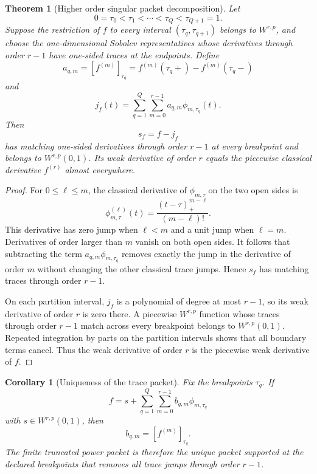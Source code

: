 \documentclass[11pt,letterpaper]{article}
\newtheorem{theorem}{Theorem}[section]
\theoremstyle{plain}
\theoremstyle{plain}
\theoremstyle{plain}
\newtheorem{corollary}[corollary]{Corollary}
\theoremstyle{definition}
\theoremstyle{definition}
\theoremstyle{definition}
\theoremstyle{definition}
\theoremstyle{remark}
\theoremstyle{remark}
\theoremstyle{remark}
\theoremstyle{remark}
\newcommand{\jump}[1]{\left[#1\right]}
\begin{document}
\begin{theorem}[Higher order singular packet decomposition]\label{thm:higher_order_packet_decomposition}
Let
\[
0=\tau_0<\tau_1<\cdots<\tau_Q<\tau_{Q+1}=1.
\]
Suppose the restriction of \(f\) to every interval \((\tau_q,\tau_{q+1})\) belongs to \(W^{r,p}\), and choose the one-dimensional Sobolev representatives whose derivatives through order \(r-1\) have one-sided traces at the endpoints. Define
\[
a_{q,m}
=
\jump{f^{(m)}}_{\tau_q}
=
f^{(m)}(\tau_q+)-f^{(m)}(\tau_q-)
\]
and
\[
j_f(t)
=
\sum_{q=1}^{Q}\sum_{m=0}^{r-1}a_{q,m}\phi_{m,\tau_q}(t).
\]
Then
\[
s_f=f-j_f
\]
has matching one-sided derivatives through order \(r-1\) at every breakpoint and belongs to \(W^{r,p}(0,1)\). Its weak derivative of order \(r\) equals the piecewise classical derivative \(f^{(r)}\) almost everywhere.
\end{theorem}

\begin{proof}
For \(0\leq \ell\leq m\), the classical derivative of \(\phi_{m,\tau}\) on the two open sides is
\[
\phi_{m,\tau}^{(\ell)}(t)
=
\frac{(t-\tau)_+^{m-\ell}}{(m-\ell)!}.
\]
This derivative has zero jump when \(\ell<m\) and a unit jump when \(\ell=m\). Derivatives of order larger than \(m\) vanish on both open sides. It follows that subtracting the term \(a_{q,m}\phi_{m,\tau_q}\) removes exactly the jump in the derivative of order \(m\) without changing the other classical trace jumps. Hence \(s_f\) has matching traces through order \(r-1\).

On each partition interval, \(j_f\) is a polynomial of degree at most \(r-1\), so its weak derivative of order \(r\) is zero there. A piecewise \(W^{r,p}\) function whose traces through order \(r-1\) match across every breakpoint belongs to \(W^{r,p}(0,1)\). Repeated integration by parts on the partition intervals shows that all boundary terms cancel. Thus the weak derivative of order \(r\) is the piecewise weak derivative of \(f\).
\end{proof}

\begin{corollary}[Uniqueness of the trace packet]\label{cor:trace_packet_uniqueness}
Fix the breakpoints \(\tau_q\). If
\[
f=s+\sum_{q=1}^{Q}\sum_{m=0}^{r-1}b_{q,m}\phi_{m,\tau_q}
\]
with \(s\in W^{r,p}(0,1)\), then
\[
b_{q,m}=\jump{f^{(m)}}_{\tau_q}.
\]
The finite truncated power packet is therefore the unique packet supported at the declared breakpoints that removes all trace jumps through order \(r-1\).
\end{corollary}
\end{document}

